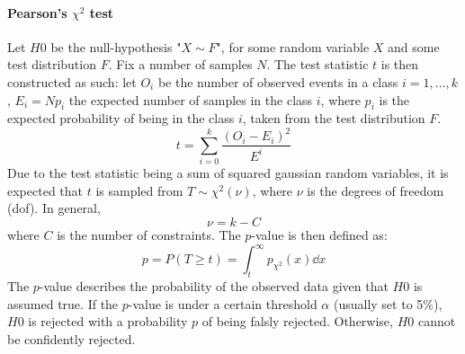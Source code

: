\paragraph{Pearson's \(\chi^2\) test}
Let \(H0\) be the null-hypothesis "\(X \sim F\)", for some random variable \(X\) and some test distribution \(F\). Fix a number of samples \(N\).
The test statistic \(t\) is then constructed as such: let \(O_i\) be the number of observed events in a class \(i=1,\dots,k\), \(E_i = Np_i\) the expected number of samples in the class \(i\), where \(p_i\) is the expected probability of being in the class \(i\), taken from the test distribution \(F\).
\begin{equation}
    t = \sum_{i=0}^k \frac{(O_i - E_i)^2}{E^i}
\end{equation}
Due to the test statistic being a sum of squared gaussian random variables, it is expected that \(t\) is sampled from \(T \sim \chi^2(\nu)\), where \(\nu\) is the degrees of freedom (dof). In general,
\begin{equation}
    \nu = k-C
\end{equation} 
where \(C\) is the number of constraints. The \(p\)-value is then defined as:
\begin{equation}
    p = P(T \ge t) = \int_t^\infty p_{\chi^2}(x) \dd x
\end{equation}
The \(p\)-value describes the probability of the observed data given that \(H0\) is assumed true. If the \(p\)-value is under a certain threshold \(\alpha\) (usually set to 5\%), \(H0\) is rejected with a probability \(p\) of being falsly rejected. Otherwise, \(H0\) cannot be confidently rejected.